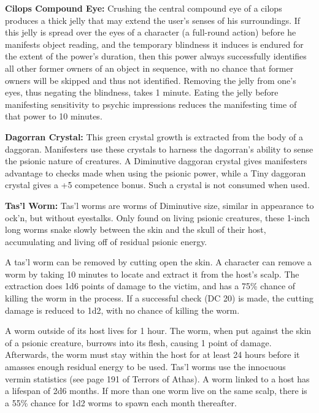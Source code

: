 \textbf{Cilops Compound Eye:} Crushing the central compound eye of a cilops produces a thick jelly that may extend the user's senses of his surroundings. If this jelly is spread over the eyes of a character (a full-round action) before he manifests object reading, and the temporary blindness it induces is endured for the extent of the power's duration, then this power always successfully identifies all other former owners of an object in sequence, with no chance that former owners will be skipped and thus not identified. Removing the jelly from one's eyes, thus negating the blindness, takes 1 minute. Eating the jelly before manifesting sensitivity to psychic impressions reduces the manifesting time of that power to 10 minutes.

\textbf{Dagorran Crystal:} This green crystal growth is extracted from the body of a daggoran. Manifesters use these crystals to harness the dagorran's ability to sense the psionic nature of creatures. A Diminutive daggoran crystal gives manifesters advantage to  checks made when using the  psionic power, while a Tiny daggoran crystal gives a +5 competence bonus. Such a crystal is not consumed when used.

\textbf{Tas'l Worm:} Tas'l worms are worms of Diminutive size, similar in appearance to ock'n, but without eyestalks. Only found on living psionic creatures, these 1-inch long worms snake slowly between the skin and the skull of their host, accumulating and living off of residual psionic energy.

A tas'l worm can be removed by cutting open the skin. A character can remove a worm by taking 10 minutes to locate and extract it from the host's scalp. The extraction does 1d6 points of damage to the victim, and has a 75\% chance of killing the worm in the process. If a successful  check (DC 20) is made, the cutting damage is reduced to 1d2, with no chance of killing the worm.

A worm outside of its host lives for 1 hour. The worm, when put against the skin of a psionic creature, burrows into its flesh, causing 1 point of damage. Afterwards, the worm must stay within the host for at least 24 hours before it amasses enough residual energy to be used. Tas'l worms use the innocuous vermin statistics (see page 191 of Terrors of Athas). A worm linked to a host has a lifespan of 2d6 months. If more than one worm live on the same scalp, there is a 55\% chance for 1d2 worms to spawn each month thereafter.

